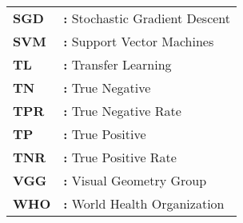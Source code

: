 \begin{tabular}{p{2cm}l}
{\bf SGD}   & {\bf:} Stochastic Gradient Descent\\ 
{\bf SVM}   & {\bf:} Support Vector Machines\\
{\bf TL}    & {\bf:} Transfer Learning\\
{\bf TN}    & {\bf:} True Negative\\
{\bf TPR}   & {\bf:} True Negative Rate\\
{\bf TP}    & {\bf:} True Positive\\
{\bf TNR}   & {\bf:} True Positive Rate\\
{\bf VGG}   & {\bf:} Visual Geometry Group\\
{\bf WHO}   & {\bf:} World Health Organization\\
\end{tabular}

